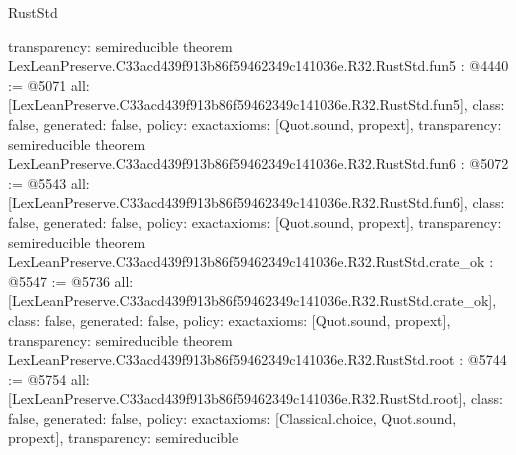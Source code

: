 \begin{lexlean}{RustStd}
\begin{coremodule}
{  transparency: semireducible
}
theorem LexLeanPreserve.C33acd439f913b86f59462349c141036e.R32.RustStd.fun5 : @4440 := @5071 {
  all: [LexLeanPreserve.C33acd439f913b86f59462349c141036e.R32.RustStd.fun5],
  class: false,
  generated: false,
  policy: exact{axioms: [Quot.sound, propext]},
  transparency: semireducible
}
theorem LexLeanPreserve.C33acd439f913b86f59462349c141036e.R32.RustStd.fun6 : @5072 := @5543 {
  all: [LexLeanPreserve.C33acd439f913b86f59462349c141036e.R32.RustStd.fun6],
  class: false,
  generated: false,
  policy: exact{axioms: [Quot.sound, propext]},
  transparency: semireducible
}
theorem LexLeanPreserve.C33acd439f913b86f59462349c141036e.R32.RustStd.crate_ok : @5547 := @5736 {
  all: [LexLeanPreserve.C33acd439f913b86f59462349c141036e.R32.RustStd.crate_ok],
  class: false,
  generated: false,
  policy: exact{axioms: [Quot.sound, propext]},
  transparency: semireducible
}
theorem LexLeanPreserve.C33acd439f913b86f59462349c141036e.R32.RustStd.root : @5744 := @5754 {
  all: [LexLeanPreserve.C33acd439f913b86f59462349c141036e.R32.RustStd.root],
  class: false,
  generated: false,
  policy: exact{axioms: [Classical.choice, Quot.sound, propext]},
  transparency: semireducible
}


\end{coremodule}
\end{lexlean}
